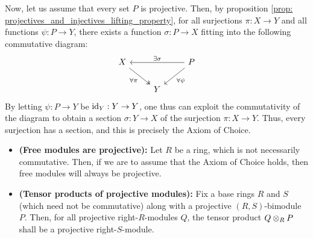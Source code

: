 \begin{remark}
                Now, let us assume that every set $P$ is projective. Then, by proposition \ref{prop: projectives_and_injectives_lifting_property}, for all surjections $\pi: X \to Y$ and all functions $\psi: P \to Y$, there exists a function $\sigma: P \to X$ fitting into the following commutative diagram:
                    $$
                        \begin{tikzcd}
                        	X && P \\
                        	& Y
                        	\arrow["\forall \pi"', two heads, from=1-1, to=2-2]
                        	\arrow["\forall \psi", from=1-3, to=2-2]
                        	\arrow["{\exists \sigma}"', from=1-3, to=1-1]
                        \end{tikzcd}
                    $$
                By letting $\psi: P \to Y$ be $\mathrm{id}_Y: Y \to Y$, one thus can exploit the commutativity of the diagram to obtain a section $\sigma: Y \to X$ of the surjection $\pi: X \to Y$. Thus, every surjection has a section, and this is precisely the Axiom of Choice. 
            \end{remark}
            \begin{corollary} \label{coro: tensor_products_freeness_and_projectiveness}
                \noindent
                \begin{itemize}
                    \item \textbf{(Free modules are projective):} Let $R$ be a ring, which is not necessarily commutative. Then, if we are to assume that the Axiom of Choice holds, then free modules will always be projective.
                    \item \textbf{(Tensor products of projective modules):} Fix a base rings $R$ and $S$ (which need not be commutative) along with a projective $(R, S)$-bimodule $P$. Then, for all projective right-$R$-modules $Q$, the tensor product $Q \tensor_R P$ shall be a projective right-$S$-module.
                \end{itemize}
            \end{corollary}
